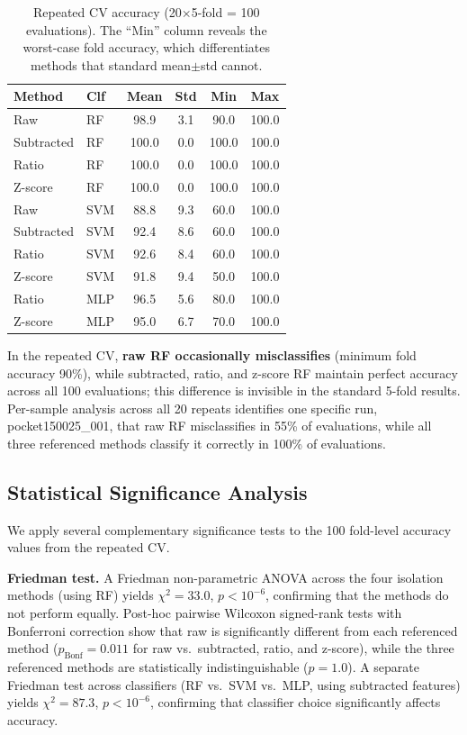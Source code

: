 \begin{table}[H]
\caption{Repeated CV accuracy (20$\times$5-fold = 100 evaluations). The ``Min'' column reveals the worst-case fold accuracy, which differentiates methods that standard mean$\pm$std cannot.}\label{tab:repeated_cv}
\centering
\begin{tabular}{llcccc}
\toprule
\textbf{Method} & \textbf{Clf} & \textbf{Mean} & \textbf{Std} & \textbf{Min} & \textbf{Max} \\
\midrule
Raw        & RF  & 98.9 & 3.1 & 90.0 & 100.0 \\
Subtracted & RF  & 100.0 & 0.0 & 100.0 & 100.0 \\
Ratio      & RF  & 100.0 & 0.0 & 100.0 & 100.0 \\
Z-score    & RF  & 100.0 & 0.0 & 100.0 & 100.0 \\
\midrule
Raw        & SVM & 88.8 & 9.3 & 60.0 & 100.0 \\
Subtracted & SVM & 92.4 & 8.6 & 60.0 & 100.0 \\
Ratio      & SVM & 92.6 & 8.4 & 60.0 & 100.0 \\
Z-score    & SVM & 91.8 & 9.4 & 50.0 & 100.0 \\
\midrule
Ratio      & MLP & 96.5 & 5.6 & 80.0 & 100.0 \\
Z-score    & MLP & 95.0 & 6.7 & 70.0 & 100.0 \\
\bottomrule
\end{tabular}
\end{table}

In the repeated CV, \textbf{raw RF occasionally misclassifies} (minimum fold accuracy 90\%), while subtracted, ratio, and z-score RF maintain perfect accuracy across all 100 evaluations; this difference is invisible in the standard 5-fold results. Per-sample analysis across all 20 repeats identifies one specific run, pocket150025\_001, that raw RF misclassifies in 55\% of evaluations, while all three referenced methods classify it correctly in 100\% of evaluations.

\subsection{Statistical Significance Analysis}

We apply several complementary significance tests to the 100 fold-level accuracy values from the repeated CV.

\textbf{Friedman test.} A Friedman non-parametric ANOVA across the four isolation methods (using RF) yields $\chi^2 = 33.0$, $p < 10^{-6}$, confirming that the methods do not perform equally. Post-hoc pairwise Wilcoxon signed-rank tests with Bonferroni correction show that raw is significantly different from each referenced method ($p_{\mathrm{Bonf}} = 0.011$ for raw vs.\ subtracted, ratio, and z-score), while the three referenced methods are statistically indistinguishable ($p = 1.0$). A separate Friedman test across classifiers (RF vs.\ SVM vs.\ MLP, using subtracted features) yields $\chi^2 = 87.3$, $p < 10^{-6}$, confirming that classifier choice significantly affects accuracy.

